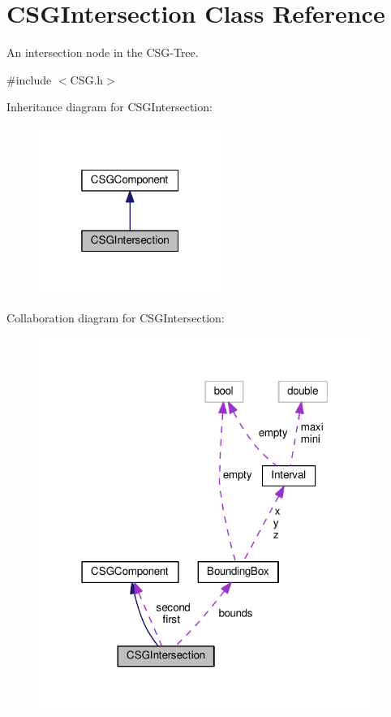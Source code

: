 \hypertarget{classCSGIntersection}{}\section{C\+S\+G\+Intersection Class Reference}
\label{classCSGIntersection}


An intersection node in the C\+S\+G-\/\+Tree.  




{\ttfamily \#include $<$C\+S\+G.\+h$>$}



Inheritance diagram for C\+S\+G\+Intersection\+:\nopagebreak
\begin{figure}[H]
\begin{center}
\leavevmode
\includegraphics[width=169pt]{classCSGIntersection__inherit__graph}
\end{center}
\end{figure}


Collaboration diagram for C\+S\+G\+Intersection\+:\nopagebreak
\begin{figure}[H]
\begin{center}
\leavevmode
\includegraphics[width=307pt]{classCSGIntersection__coll__graph}
\end{center}
\end{figure}
